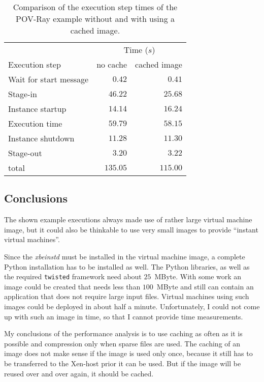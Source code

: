 \begin{table}[ht]
  \centering
  \begin{tabular}{@{}lrr@{}}\toprule
                           &    \multicolumn{2}{c}{Time ($s$)} \\ \cmidrule(lr){2-3}
    Execution step         &  no cache          & cached image \\ \midrule %
    Wait for start message &   $   0.42 $       & $   0.41  $    \\
    Stage-in               &   $  46.22 $       & $  25.68  $    \\
    Instance startup       &   $  14.14 $       & $  16.24  $    \\
    Execution time         &   $  59.79 $       & $  58.15  $    \\
    Instance shutdown      &   $  11.28 $       & $  11.30  $    \\
    Stage-out              &   $   3.20 $       & $   3.22  $    \\
    total                  &   $ 135.05 $       & $ 115.00  $    \\
   \bottomrule
 \end{tabular}
 \caption[Not cached \vs cached images]{Comparison of the execution step times of the POV-Ray example without and with using a
   cached image.}
 \label{tab:povray-nocache-cache-comparision-short}
\end{table}

\subsection{Conclusions}

The  shown example  executions always  made  use of  rather large  virtual
machine image, but it could also  be thinkable to use very small images to
provide ``instant  virtual machines''.

Since the \emph{xbeinstd} must be  installed in the virtual machine image,
a complete  Python installation has to  be installed as  well.  The Python
libraries, as  well as the required \texttt{twisted}  framework need about
$25$~MByte. With some work an image  could be created that needs less than
$100$~MByte and  still can  contain an application  that does  not require
large input files.   Virtual machines using such images  could be deployed
in about  half a minute. Unfortunately, I  could not come up  with such an
image in time, so that I cannot provide time measurements.

My conclusions of  the performance analysis is to use  caching as often as
it  is possible  and compression  only when  sparse files  are  used.  The
caching of an  image does not make  sense if the image is  used only once,
because it  still has to  be transferred to  the Xen-host prior it  can be
used. But if  the image will be  reused over and over again,  it should be
cached.

